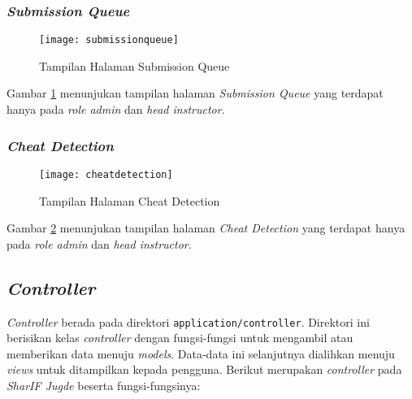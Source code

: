 \subsubsection{\textit{Submission Queue}}
\begin{figure}[H]
	\centering  
	\texttt{[image: submissionqueue]}  
	\caption[Tampilan Halaman \textit{Submission Queue}]{Tampilan Halaman Submission Queue} 
	\label{fig:submissionqueue} 
\end{figure}

Gambar \ref{fig:submissionqueue} menunjukan tampilan halaman \textit{Submission Queue} yang terdapat hanya pada \textit{role admin} dan \textit{head instructor}.

\subsubsection{\textit{Cheat Detection}}
\begin{figure}[H]
	\centering  
	\texttt{[image: cheatdetection]}  
	\caption[Tampilan Halaman \textit{Cheat Detection}]{Tampilan Halaman Cheat Detection} 
	\label{fig:cheatdetection} 
\end{figure}

Gambar \ref{fig:cheatdetection} menunjukan tampilan halaman \textit{Cheat Detection} yang terdapat hanya pada \textit{role admin} dan \textit{head instructor}.

\subsection{\textit{Controller}}
\textit{Controller} berada pada direktori \texttt{application/controller}. Direktori ini berisikan kelas \textit{controller} dengan fungsi-fungsi untuk mengambil atau memberikan data menuju \textit{models}. Data-data ini selanjutnya dialihkan menuju \textit{views} untuk ditampilkan kepada pengguna. Berikut merupakan \textit{controller} pada \textit{SharIF Jugde} beserta fungsi-fungsinya:
